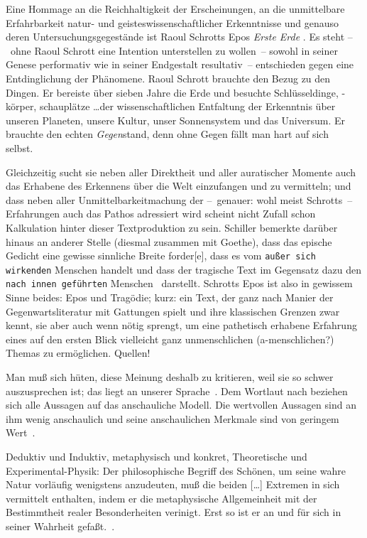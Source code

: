 Eine Hommage an die Reichhaltigkeit der Erscheinungen, an die unmittelbare
  Erfahrbarkeit natur- und geisteswissenschaftlicher Erkenntnisse und genauso
  deren Untersuchungsgegestände ist Raoul Schrotts Epos \emph{Erste Erde}
  \citep{Schrott2016ErsteErde}.
Es steht --~ohne Raoul Schrott eine Intention unterstellen zu wollen~--
  sowohl in seiner Genese performativ wie in seiner Endgestalt resultativ~--
  entschieden gegen eine Entdinglichung der Phänomene. Raoul Schrott brauchte
  den Bezug zu den Dingen. Er bereiste über sieben Jahre die Erde und besuchte
  Schlüsseldinge, -körper, schauplätze \ldots der wissenschaftlichen
  Entfaltung der Erkenntnis über unseren Planeten, unsere Kultur, unser
  Sonnensystem und das Universum. Er brauchte den echten \emph{Gegen}stand,
   \glqq denn ohne Gegen fällt man hart auf sich selbst.\grqq\ \citep[S.
   60]{Han2016}

Gleichzeitig sucht sie neben aller Direktheit und aller auratischer Momente
  auch das Erhabene des Erkennens über die Welt einzufangen und zu vermitteln;
  und dass neben aller Unmittelbarkeitmachung der --~genauer: wohl meist
  Schrotts~-- Erfahrungen auch das Pathos adressiert wird scheint nicht Zufall
  schon Kalkulation hinter dieser Textproduktion zu sein.
Schiller bemerkte darüber hinaus an anderer Stelle (diesmal zusammen mit
  Goethe), dass das epische Gedicht \glqq eine gewisse sinnliche Breite
  forder[e]\grqq, dass es vom \glqq\texttt{au\ss er sich wirkenden} Menschen
  handelt und dass der tragische Text im Gegensatz dazu den \glqq\texttt{nach
  innen geführten} Menschen \grqq\ darstellt.
Schrotts Epos ist also in gewissem Sinne beides: Epos und Tragödie; kurz: ein
  Text, der ganz nach Manier der Gegenwartsliteratur mit Gattungen spielt und
  ihre klassischen Grenzen zwar kennt, sie aber auch wenn nötig sprengt, um
  eine pathetisch erhabene Erfahrung eines auf den ersten Blick vielleicht
  ganz unmenschlichen (a-menschlichen?) Themas zu ermöglichen. 
Quellen!

\glqq Man muß sich hüten, diese Meinung deshalb zu kritieren, weil sie so
  schwer auszusprechen ist; das liegt an unserer Sprache\grqq\
  \citep{Schroedinger1935}. 
\glqq Dem Wortlaut nach beziehen sich alle Aussagen auf das anschauliche
  Modell. Die wertvollen Aussagen sind an ihm wenig anschaulich und seine
  anschaulichen Merkmale sind von geringem Wert\grqq\ \citep{Schroedinger1935}.

Deduktiv und Induktiv, metaphysisch und konkret, Theoretische und
  Experimental-Physik: \glqq Der philosophische Begriff des Schönen, um seine
  wahre Natur vorläufig wenigstens anzudeuten, muß die beiden [\ldots] Extremen
  in sich vermittelt enthalten, indem er die metaphysische 
  Allgemeinheit mit der Bestimmtheit realer Besonderheiten verinigt. Erst so ist
  er an und für sich in seiner Wahrheit gefaßt.\grqq\ \citep[S. 39]{Hegel1986}.
